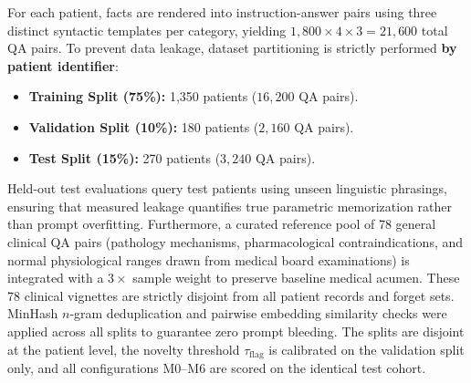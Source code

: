 \documentclass[lettersize,journal]{IEEEtran}
\begin{document}
\begin{table}[!t]
\caption{Structured PHI Fact Extraction from MIMIC-III\label{tab:facts}}
\centering
\small
{}
\end{table}

For each patient, facts are rendered into instruction-answer pairs using three distinct syntactic templates per category, yielding $1,800 \times 4 \times 3 = 21,600$ total QA pairs. To prevent data leakage, dataset partitioning is strictly performed \textbf{by patient identifier}:
\begin{itemize}
    \item \textbf{Training Split (75\%):} 1,350 patients ($16,200$ QA pairs).
    \item \textbf{Validation Split (10\%):} 180 patients ($2,160$ QA pairs).
    \item \textbf{Test Split (15\%):} 270 patients ($3,240$ QA pairs).
\end{itemize}
Held-out test evaluations query test patients using unseen linguistic phrasings, ensuring that measured leakage quantifies true parametric memorization rather than prompt overfitting. Furthermore, a curated reference pool of 78 general clinical QA pairs (pathology mechanisms, pharmacological contraindications, and normal physiological ranges drawn from medical board examinations) is integrated with a $3\times$ sample weight to preserve baseline medical acumen. These 78 clinical vignettes are strictly disjoint from all patient records and forget sets. MinHash $n$-gram deduplication and pairwise embedding similarity checks were applied across all splits to guarantee zero prompt bleeding. The splits are disjoint at the patient level, the novelty threshold $\tau_{\mathrm{flag}}$ is calibrated on the validation split only, and all configurations M0--M6 are scored on the identical test cohort.
\end{document}
